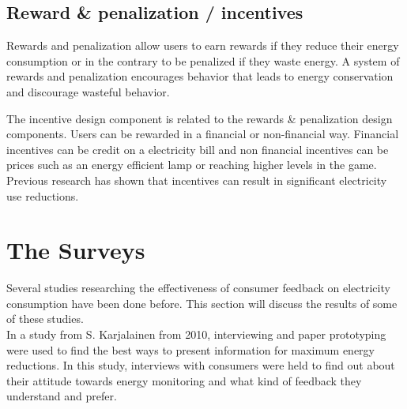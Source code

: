 \documentclass[journal]{vgtc}                %
\begin{document}
\subsection{Reward \& penalization / incentives}
Rewards and penalization allow users to earn rewards if they reduce their energy consumption or in the contrary to be penalized if they waste energy. A system of rewards and penalization encourages behavior that leads to energy conservation and discourage wasteful behavior.

The incentive design component is related to the rewards \& penalization design components. Users can be rewarded in a financial or non-financial way. Financial incentives can be credit on a electricity bill and non financial incentives can be prices such as an energy efficient lamp or reaching higher levels in the game.
Previous research \cite{petersen2007dormitory} has shown that incentives can result in significant electricity use reductions.


\section{The Surveys}
Several studies researching the effectiveness of consumer feedback on electricity consumption have been done before.
This section will discuss the results of some of these studies. \\

In a study from S. Karjalainen\cite{karjalainen2011consumer} from 2010, interviewing and paper prototyping were used to find the best ways to present information for maximum energy reductions. In this study, interviews with consumers were held to find out about their attitude towards energy monitoring and what kind of feedback they understand and prefer.
\end{document}
